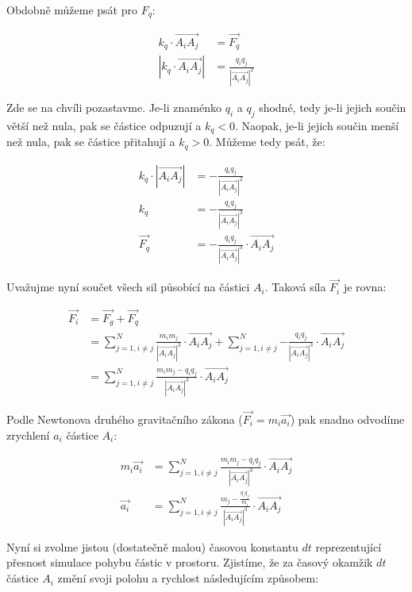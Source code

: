 \documentclass[10pt,a4paper]{article}
\begin{document}
Obdobně můžeme psát pro $ F_q $:

\begin{align*}
k_q\cdot\vec{A_i A_j} &= \vec{F_q} \\
|k_q\cdot\vec{A_i A_j}| &= \frac{q_i q_j}{|\vec{A_i A_j}|^2}
\end{align*}

Zde se na chvíli pozastavme. Je-li znaménko $ q_i $ a $ q_j $ shodné,
tedy je-li jejich součin větší než nula, pak se částice odpuzují a
$ k_q < 0 $. Naopak, je-li jejich součin menší než nula, pak se částice
přitahují a $ k_q > 0 $. Můžeme tedy psát, že:

\begin{align*}
k_q\cdot|\vec{A_i A_j}| &= -\frac{q_i q_j}{|\vec{A_i A_j}|^2} \\
k_q &= -\frac{q_i q_j}{|\vec{A_i A_j}|^3} \\
\vec{F_q} &= -\frac{q_i q_j}{|\vec{A_i A_j}|^3} \cdot \vec{A_i A_j}
\end{align*}

Uvažujme nyní součet všech sil působící na částici $ A_i $. Taková síla
$ \vec{F_i} $ je rovna:

\begin{align*}
\vec{F_i} &= \vec{F_g} + \vec{F_q} \\
 &= \sum_{j = 1, i \neq j}^{N}{\frac{m_i m_j}{|\vec{A_i A_j}|^3} \cdot \vec{A_i A_j}}
  + \sum_{j = 1, i \neq j}^{N}{-\frac{q_i q_j}{|\vec{A_i A_j}|^3} \cdot \vec{A_i A_j}} \\
 &= \sum_{j = 1, i \neq j}^{N}{\frac{m_i m_j - q_i q_j}{|\vec{A_i A_j}|^3} \cdot \vec{A_i A_j}}
\end{align*}

Podle Newtonova druhého gravitačního zákona ($ \vec{F_i} = m_i\vec{a_i} $) pak
snadno odvodíme zrychlení $ a_i $ částice $ A_i $:

\begin{align*}
m_i\vec{a_i} &=
  \sum_{j = 1, i \neq j}^{N}{\frac{m_i m_j - q_i q_j}{|\vec{A_i A_j}|^3} \cdot \vec{A_i A_j}} \\
\vec{a_i} &=
  \sum_{j = 1, i \neq j}^{N}{\frac{m_j - \frac{q_i q_j}{m_i}}{|\vec{A_i A_j}|^3} \cdot \vec{A_i A_j}}
\end{align*}

Nyní si zvolme jistou (dostatečně malou) časovou konstantu $ dt $
reprezentující přesnost simulace pohybu částic v prostoru. Zjistíme, že za
časový okamžik $ dt $ částice $ A_i $ změní svoji polohu a rychlost
následujícím způsobem:
\end{document}
